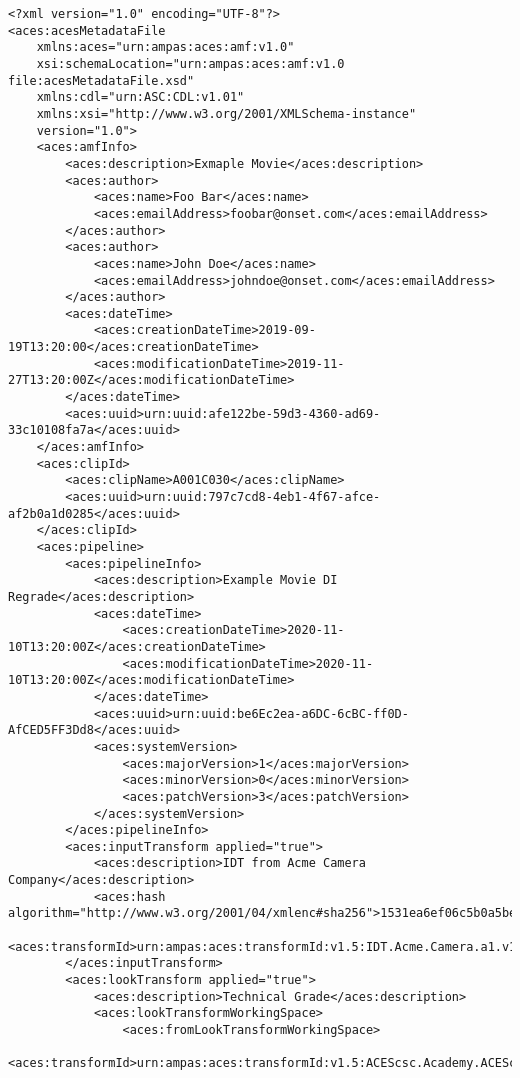 \begin{lstlisting}
<?xml version="1.0" encoding="UTF-8"?>
<aces:acesMetadataFile 
    xmlns:aces="urn:ampas:aces:amf:v1.0"
    xsi:schemaLocation="urn:ampas:aces:amf:v1.0 file:acesMetadataFile.xsd"
    xmlns:cdl="urn:ASC:CDL:v1.01"
    xmlns:xsi="http://www.w3.org/2001/XMLSchema-instance"
    version="1.0">
    <aces:amfInfo>
        <aces:description>Exmaple Movie</aces:description>
        <aces:author>
            <aces:name>Foo Bar</aces:name>
            <aces:emailAddress>foobar@onset.com</aces:emailAddress>
        </aces:author>
        <aces:author>
            <aces:name>John Doe</aces:name> 
            <aces:emailAddress>johndoe@onset.com</aces:emailAddress>
        </aces:author>
        <aces:dateTime>
            <aces:creationDateTime>2019-09-19T13:20:00</aces:creationDateTime>
            <aces:modificationDateTime>2019-11-27T13:20:00Z</aces:modificationDateTime>
        </aces:dateTime>
        <aces:uuid>urn:uuid:afe122be-59d3-4360-ad69-33c10108fa7a</aces:uuid>
    </aces:amfInfo>
    <aces:clipId>
        <aces:clipName>A001C030</aces:clipName>
        <aces:uuid>urn:uuid:797c7cd8-4eb1-4f67-afce-af2b0a1d0285</aces:uuid>
    </aces:clipId>
    <aces:pipeline>
        <aces:pipelineInfo>
            <aces:description>Example Movie DI Regrade</aces:description>
            <aces:dateTime>
                <aces:creationDateTime>2020-11-10T13:20:00Z</aces:creationDateTime>
                <aces:modificationDateTime>2020-11-10T13:20:00Z</aces:modificationDateTime>
            </aces:dateTime>
            <aces:uuid>urn:uuid:be6Ec2ea-a6DC-6cBC-ff0D-AfCED5FF3Dd8</aces:uuid>
            <aces:systemVersion>
                <aces:majorVersion>1</aces:majorVersion>
                <aces:minorVersion>0</aces:minorVersion>
                <aces:patchVersion>3</aces:patchVersion>
            </aces:systemVersion>
        </aces:pipelineInfo>
        <aces:inputTransform applied="true">
            <aces:description>IDT from Acme Camera Company</aces:description>
            <aces:hash algorithm="http://www.w3.org/2001/04/xmlenc#sha256">1531ea6ef06c5b0a5bea80c94f60c7b68e3989e3c90b8ebd25c28aa4670c30f8</aces:hash>
            <aces:transformId>urn:ampas:aces:transformId:v1.5:IDT.Acme.Camera.a1.v1</aces:transformId>
        </aces:inputTransform>
        <aces:lookTransform applied="true">
            <aces:description>Technical Grade</aces:description>
            <aces:lookTransformWorkingSpace>
                <aces:fromLookTransformWorkingSpace>
                    <aces:transformId>urn:ampas:aces:transformId:v1.5:ACEScsc.Academy.ACEScct_to_ACES.a1.0.3</aces:transformId>

\end{lstlisting}
